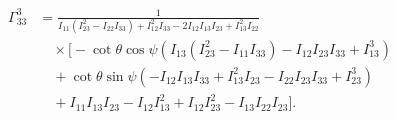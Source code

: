 \documentclass[lineno, pdflatex,sn-mathphys-ay]{sn-jnl}
\theoremstyle{thmstyleone}%
\theoremstyle{thmstyletwo}%
\theoremstyle{thmstylethree}%
\begin{document}
\begin{appendices}
\begin{align}
    \Gamma^{3}_{33} &= \frac{1}{I_{11} \left(I_{23}^2-I_{22} I_{33}\right)+I_{12}^2 I_{33}-2 I_{12} I_{13} I_{23}+I_{13}^2 I_{22}} \nonumber \\
    &\quad \times \Big[ -\cot \theta \cos \psi \left(I_{13} \left(I_{23}^2-I_{11} I_{33}\right)-I_{12} I_{23} I_{33}+I_{13}^3\right) \nonumber \\
    &\quad +\cot \theta \sin \psi \left(-I_{12} I_{13} I_{33}+I_{13}^2 I_{23}-I_{22} I_{23} I_{33}+I_{23}^3\right) \nonumber \\
    &\quad +I_{11} I_{13} I_{23}-I_{12} I_{13}^2+I_{12} I_{23}^2-I_{13} I_{22} I_{23} \Big].
\end{align}


\end{appendices} %









\end{document}
